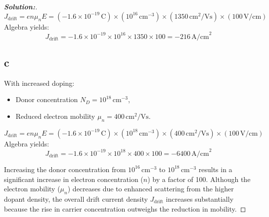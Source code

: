 \documentclass[12pt]{article}
\theoremstyle{definition}\newtheorem{problem}{Problem}
\newenvironment{solution}{\begin{proof}[\bfseries\textup{Solution:}]}{\end{proof}}
\begin{document}
\begin{solution}
    $$
    J_{\text{drift}} = e n \mu_n E = (-1.6 \times 10^{-19} \, \text{C}) \times (10^{16} \, \text{cm}^{-3}) \times (1350 \, \text{cm}^2/\text{Vs}) \times (100 \, \text{V/cm})
    $$
    Algebra yields:
    $$
    J_{\text{drift}} = - 1.6 \times 10^{-19} \times 10^{16} \times 1350 \times 100 = - 216 \, \text{A/cm}^2
    $$
    
    \subsection*{c}
    With increased doping:
    \begin{itemize}
        \item Donor concentration \( N_D = 10^{18} \, \text{cm}^{-3} \),
        \item Reduced electron mobility \( \mu_n = 400 \, \text{cm}^2/\text{Vs} \).
    \end{itemize}
    
    $$
    J_{\text{drift}} = e n \mu_n E = (-1.6 \times 10^{-19} \, \text{C}) \times (10^{18} \, \text{cm}^{-3}) \times (400 \, \text{cm}^2/\text{Vs}) \times (100 \, \text{V/cm})
    $$
    Algebra yields:
    $$
    J_{\text{drift}} = -1.6 \times 10^{-19} \times 10^{18} \times 400 \times 100 = -6400 \, \text{A/cm}^2
    $$
    
    Increasing the donor concentration from \( 10^{16} \, \text{cm}^{-3} \) to \( 10^{18} \, \text{cm}^{-3} \) results in a significant increase in electron concentration (\( n \)) by a factor of 100. Although the electron mobility (\( \mu_n \)) decreases due to enhanced scattering from the higher dopant density, the overall drift current density \( J_{\text{drift}} \) increases substantially because the rise in carrier concentration outweighs the reduction in mobility.
\end{solution}
\end{document}
